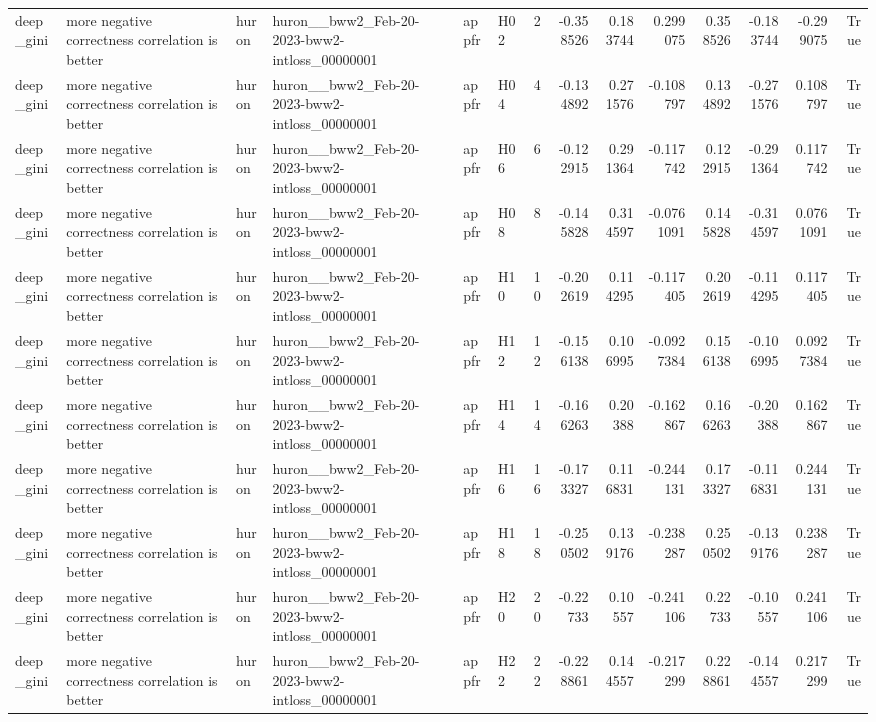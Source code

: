 \begin{longtable}{llllllrrrrrrrr}
deep\_gini & more negative correctness correlation is better & huron & huron\_\_bww2\_Feb-20-2023-bww2-intloss\_00000001 & appfr & H02 & 2 & -0.358526 & 0.183744 & 0.299075 & 0.358526 & -0.183744 & -0.299075 & True \\
deep\_gini & more negative correctness correlation is better & huron & huron\_\_bww2\_Feb-20-2023-bww2-intloss\_00000001 & appfr & H04 & 4 & -0.134892 & 0.271576 & -0.108797 & 0.134892 & -0.271576 & 0.108797 & True \\
deep\_gini & more negative correctness correlation is better & huron & huron\_\_bww2\_Feb-20-2023-bww2-intloss\_00000001 & appfr & H06 & 6 & -0.122915 & 0.291364 & -0.117742 & 0.122915 & -0.291364 & 0.117742 & True \\
deep\_gini & more negative correctness correlation is better & huron & huron\_\_bww2\_Feb-20-2023-bww2-intloss\_00000001 & appfr & H08 & 8 & -0.145828 & 0.314597 & -0.0761091 & 0.145828 & -0.314597 & 0.0761091 & True \\
deep\_gini & more negative correctness correlation is better & huron & huron\_\_bww2\_Feb-20-2023-bww2-intloss\_00000001 & appfr & H10 & 10 & -0.202619 & 0.114295 & -0.117405 & 0.202619 & -0.114295 & 0.117405 & True \\
deep\_gini & more negative correctness correlation is better & huron & huron\_\_bww2\_Feb-20-2023-bww2-intloss\_00000001 & appfr & H12 & 12 & -0.156138 & 0.106995 & -0.0927384 & 0.156138 & -0.106995 & 0.0927384 & True \\
deep\_gini & more negative correctness correlation is better & huron & huron\_\_bww2\_Feb-20-2023-bww2-intloss\_00000001 & appfr & H14 & 14 & -0.166263 & 0.20388 & -0.162867 & 0.166263 & -0.20388 & 0.162867 & True \\
deep\_gini & more negative correctness correlation is better & huron & huron\_\_bww2\_Feb-20-2023-bww2-intloss\_00000001 & appfr & H16 & 16 & -0.173327 & 0.116831 & -0.244131 & 0.173327 & -0.116831 & 0.244131 & True \\
deep\_gini & more negative correctness correlation is better & huron & huron\_\_bww2\_Feb-20-2023-bww2-intloss\_00000001 & appfr & H18 & 18 & -0.250502 & 0.139176 & -0.238287 & 0.250502 & -0.139176 & 0.238287 & True \\
deep\_gini & more negative correctness correlation is better & huron & huron\_\_bww2\_Feb-20-2023-bww2-intloss\_00000001 & appfr & H20 & 20 & -0.22733 & 0.10557 & -0.241106 & 0.22733 & -0.10557 & 0.241106 & True \\
deep\_gini & more negative correctness correlation is better & huron & huron\_\_bww2\_Feb-20-2023-bww2-intloss\_00000001 & appfr & H22 & 22 & -0.228861 & 0.144557 & -0.217299 & 0.228861 & -0.144557 & 0.217299 & True \\

\end{longtable}
